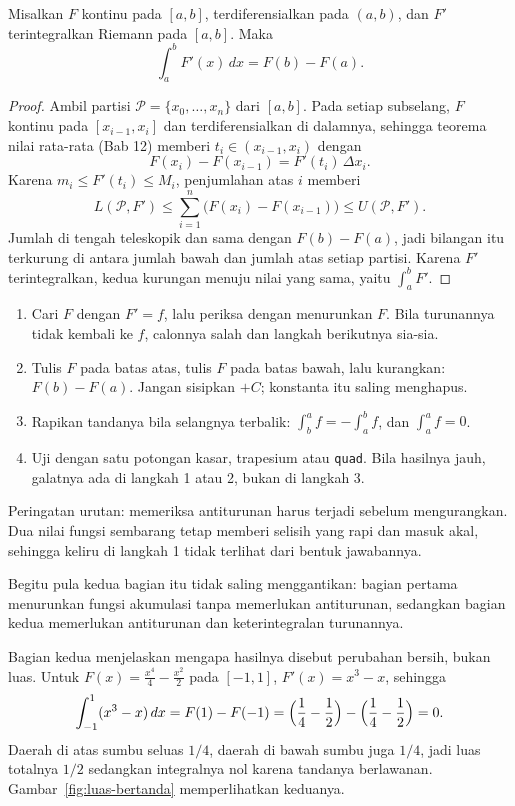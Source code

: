 \begin{teorema}
Misalkan $F$ kontinu pada $[a,b]$, terdiferensialkan pada $(a,b)$, dan $F'$
terintegralkan Riemann pada $[a,b]$. Maka
\[
\int_a^b F'(x)\,dx=F(b)-F(a).
\]
\end{teorema}

\begin{proof}
Ambil partisi $\mathcal{P}=\{x_0,\dots,x_n\}$ dari $[a,b]$. Pada setiap subselang, $F$
kontinu pada $[x_{i-1},x_i]$ dan terdiferensialkan di dalamnya, sehingga teorema nilai
rata-rata (Bab 12) memberi $t_i\in(x_{i-1},x_i)$ dengan
\[
F(x_i)-F(x_{i-1})=F'(t_i)\,\Delta x_i .
\]
Karena $m_i\le F'(t_i)\le M_i$, penjumlahan atas $i$ memberi
\[
L(\mathcal{P},F')\le\sum_{i=1}^{n}\bigl(F(x_i)-F(x_{i-1})\bigr)\le U(\mathcal{P},F').
\]
Jumlah di tengah teleskopik dan sama dengan $F(b)-F(a)$, jadi bilangan itu terkurung di
antara jumlah bawah dan jumlah atas setiap partisi. Karena $F'$ terintegralkan, kedua
kurungan menuju nilai yang sama, yaitu $\int_a^b F'$.
\end{proof}

\begin{resep}
\begin{enumerate}
\item Cari $F$ dengan $F'=f$, lalu periksa dengan menurunkan $F$. Bila turunannya tidak
      kembali ke $f$, calonnya salah dan langkah berikutnya sia-sia.
\item Tulis $F$ pada batas atas, tulis $F$ pada batas bawah, lalu kurangkan:
      $F(b)-F(a)$. Jangan sisipkan $+C$; konstanta itu saling menghapus.
\item Rapikan tandanya bila selangnya terbalik: $\int_b^a f=-\int_a^b f$, dan
      $\int_a^a f=0$.
\item Uji dengan satu potongan kasar, trapesium atau \texttt{quad}. Bila hasilnya jauh,
      galatnya ada di langkah 1 atau 2, bukan di langkah 3.
\end{enumerate}
Peringatan urutan: memeriksa antiturunan harus terjadi sebelum mengurangkan. Dua nilai
fungsi sembarang tetap memberi selisih yang rapi dan masuk akal, sehingga keliru di
langkah 1 tidak terlihat dari bentuk jawabannya.
\end{resep}

Begitu pula kedua bagian itu tidak saling menggantikan: bagian pertama menurunkan
fungsi akumulasi tanpa memerlukan antiturunan, sedangkan bagian kedua memerlukan
antiturunan dan keterintegralan turunannya.

Bagian kedua menjelaskan mengapa hasilnya disebut perubahan bersih, bukan luas. Untuk
$F(x)=\frac{x^4}{4}-\frac{x^2}{2}$ pada $[-1,1]$, $F'(x)=x^3-x$, sehingga
\[
\int_{-1}^{1}(x^3-x)\,dx=F(1)-F(-1)=\Bigl(\frac14-\frac12\Bigr)-\Bigl(\frac14-\frac12\Bigr)=0 .
\]
Daerah di atas sumbu seluas $1/4$, daerah di bawah sumbu juga $1/4$, jadi luas totalnya
$1/2$ sedangkan integralnya nol karena tandanya berlawanan.
Gambar~\ref{fig:luas-bertanda} memperlihatkan keduanya.

